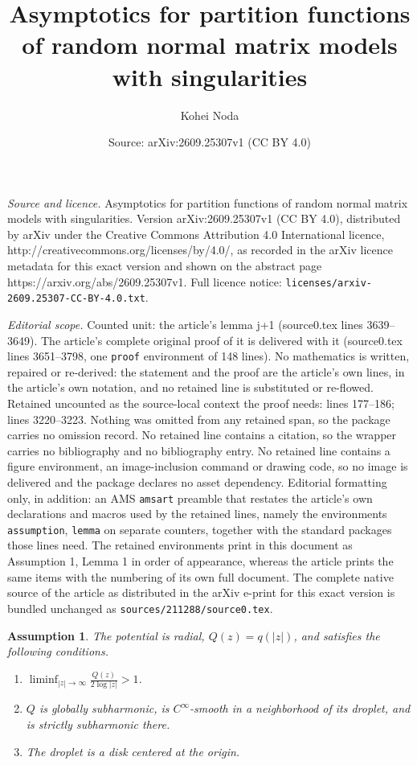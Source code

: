 \documentclass[10pt,a4paper]{amsart}
\title{Asymptotics for partition functions of random normal matrix models with singularities}
\author{Kohei Noda}
\date{Source: arXiv:2609.25307v1 (CC BY 4.0)}
\newtheorem{assumption}{Assumption}
\begin{document}
\maketitle

\noindent\emph{Source and licence.} Asymptotics for partition functions of random normal matrix models with singularities. Version arXiv:2609.25307v1 (CC BY 4.0), distributed by arXiv under the Creative Commons Attribution 4.0 International licence, http://creativecommons.org/licenses/by/4.0/, as recorded in the arXiv licence metadata for this exact version and shown on the abstract page https://arxiv.org/abs/2609.25307v1. Full licence notice: \texttt{licenses/arxiv-2609.25307-CC-BY-4.0.txt}.\par\smallskip

\noindent\textit{Editorial scope.} Counted unit: the article's lemma j+1 (source0.tex lines 3639--3649). The article's complete original proof of it is delivered with it (source0.tex lines 3651--3798, one \texttt{proof} environment of 148 lines). No mathematics is written, repaired or re-derived: the statement and the proof are the article's own lines, in the article's own notation, and no retained line is substituted or re-flowed.  Retained uncounted as the source-local context the proof needs: lines 177--186; lines 3220--3223.  Nothing was omitted from any retained span, so the package carries no omission record.  No retained line contains a citation, so the wrapper carries no bibliography and no bibliography entry.  No retained line contains a figure environment, an image-inclusion command or drawing code, so no image is delivered and the package declares no asset dependency.  Editorial formatting only, in addition: an AMS \texttt{amsart} preamble that restates the article's own declarations and macros used by the retained lines, namely the environments \texttt{assumption}, \texttt{lemma} on separate counters, together with the standard packages those lines need.  The retained environments print in this document as Assumption 1, Lemma 1 in order of appearance, whereas the article prints the same items with the numbering of its own full document.  The complete native source of the article as distributed in the arXiv e-print for this exact version is bundled unchanged as \texttt{sources/211288/source0.tex}.
\begin{assumption}\label{Assumption_Q}
The potential is radial, $Q(z)=q(|z|)$, and satisfies the following conditions.
\begin{enumerate}[label=\textup{(\arabic*)}]
\item\label{Assumption 1}
$\displaystyle \liminf_{|z|\to\infty}\frac{Q(z)}{2\log|z|}>1$.
\item\label{Assumption 2}
$Q$ is globally subharmonic, is $C^\infty$-smooth in a neighborhood of its droplet, and is strictly subharmonic there.
\item The droplet is a disk centered at the origin.
\end{enumerate}
\end{assumption}
\end{document}
